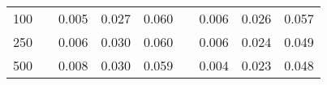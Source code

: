 % 
\begin{tabular}{ccccccccc}
  \hline
  \hline
100 &  & 0.005 & 0.027 & 0.060 &  & 0.006 & 0.026 & 0.057 \\ 
  250 &  & 0.006 & 0.030 & 0.060 &  & 0.006 & 0.024 & 0.049 \\ 
  500 &  & 0.008 & 0.030 & 0.059 &  & 0.004 & 0.023 & 0.048 \\ 
   \hline
\end{tabular}
